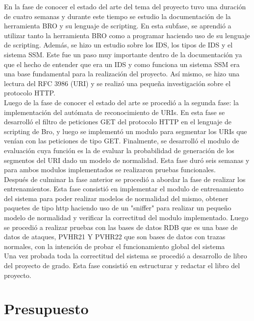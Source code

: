 En la fase de conocer el estado del arte del tema del proyecto tuvo una duraci\'on de cuatro semanas y durante este tiempo se estudio la documentaci\'on de la herramienta BRO y su lenguaje de scripting. En esta subfase, se aprendi\'o a utilizar tanto la herramienta BRO como a programar haciendo uso de su lenguaje de scripting. Adem\'as, se hizo un estudio sobre los IDS, los tipos de IDS y el sistema SSM. 
Este fue un paso muy importante dentro de la documentaci\'on ya que el hecho de entender que era un IDS y como funciona un sistema SSM era una base fundamental para la realizaci\'on del proyecto. As\'i mismo, se hizo una lectura del RFC 3986 (URI) y se realiz\'o una pequeña investigaci\'on sobre el protocolo HTTP.\\

Luego de la fase de conocer el estado del arte se procedi\'o a la segunda fase: la implementaci\'on del aut\'omata de reconocimiento de URIs. En esta fase se desarroll\'o el filtro de peticiones GET del protocolo HTTP en el lenguaje de scripting de Bro, y luego se implement\'o un modulo para segmentar los URIs que ven\'ian con las peticiones de tipo GET. Finalmente, se desarroll\'o el modulo de evaluaci\'on cuya funci\'on es la de evaluar la probabilidad de generaci\'on de los segmentos del URI dado un modelo de normalidad. Esta fase dur\'o seis semanas y para ambos modulos implementados se realizaron pruebas funcionales.\\

Despu\'es de culminar la fase anterior se procedi\'o a abordar la fase de realizar los entrenamientos. Esta fase consisti\'o en implementar el modulo de entrenamiento del sistema para poder realizar modelos de normalidad del mismo, obtener paquetes de tipo http haciendo uso de un "sniffer" para realizar un pequeño modelo de normalidad y verificar la correctitud del modulo implementado. Luego se procedi\'o a realizar pruebas con las bases de datos RDB que es una base de datos de ataques, PVHR21 Y PVHR22 que son bases de datos con trazas normales, con la intenci\'on de probar el funcionamiento global del sistema\\

Una vez probada toda la correctitud del sistema se procedi\'o a desarrollo de libro del proyecto de grado. Esta fase consisti\'o en estructurar y redactar el libro del proyecto.

\section{Presupuesto}


